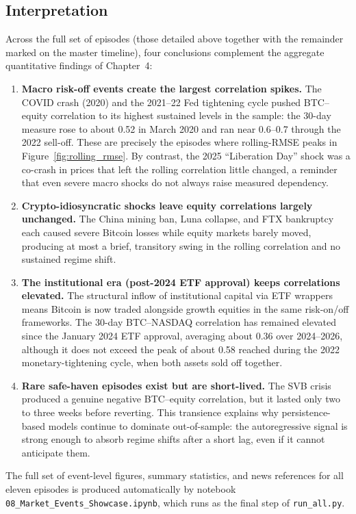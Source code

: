 \subsection*{Interpretation}

Across the full set of episodes (those detailed above together with the remainder
marked on the master timeline), four conclusions complement the aggregate
quantitative findings of Chapter~4:

\begin{enumerate}
    \item \textbf{Macro risk-off events create the largest correlation spikes.}
    The COVID crash (2020) and the 2021--22 Fed tightening cycle pushed BTC--equity
    correlation to its highest sustained levels in the sample: the 30-day measure rose
    to about 0.52 in March 2020 and ran near 0.6--0.7 through the 2022 sell-off. These
    are precisely the episodes where rolling-RMSE peaks in Figure~\ref{fig:rolling_rmse}.
    By contrast, the 2025 ``Liberation Day'' shock was a co-crash in prices that left the
    rolling correlation little changed, a reminder that even severe macro shocks do
    not always raise measured dependency.

    \item \textbf{Crypto-idiosyncratic shocks leave equity correlations largely unchanged.}
    The China mining ban, Luna collapse, and FTX bankruptcy each caused severe Bitcoin
    losses while equity markets barely moved, producing at most a brief, transitory
    swing in the rolling correlation and no sustained regime shift.

    \item \textbf{The institutional era (post-2024 ETF approval) keeps correlations elevated.}
    The structural inflow of institutional capital via ETF wrappers means Bitcoin is
    now traded alongside growth equities in the same risk-on/off frameworks. The 30-day
    BTC--NASDAQ correlation has remained elevated since the January 2024 ETF approval,
    averaging about 0.36 over 2024--2026, although it does not exceed the peak of about
    0.58 reached during the 2022 monetary-tightening cycle, when both assets sold off together.

    \item \textbf{Rare safe-haven episodes exist but are short-lived.}
    The SVB crisis produced a genuine negative BTC--equity correlation, but it lasted
    only two to three weeks before reverting. This transience explains why persistence-based
    models continue to dominate out-of-sample: the autoregressive signal is strong
    enough to absorb regime shifts after a short lag, even if it cannot anticipate them.
\end{enumerate}

The full set of event-level figures, summary statistics, and news references for all
eleven episodes is produced automatically by notebook
\texttt{08\_Market\_Events\_Showcase.ipynb}, which runs as the final step of
\texttt{run\_all.py}.

\clearpage
